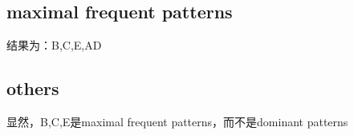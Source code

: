 \documentclass{article}
\begin{document}
		\subsection{maximal frequent patterns}
		\begin{center}
			结果为：B,C,E,AD
		\end{center}
		\subsection{others}
		\begin{center}
			显然，B,C,E是maximal frequent patterns，而不是dominant patterns
		\end{center}
	
\end{document}
